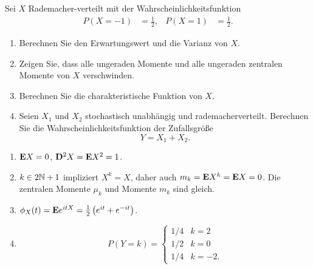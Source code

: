  Sei $X$ Rademacher-verteilt mit der
Wahrscheinlichkeitsfunktion
\begin{align*}
    P(X=-1) &= \frac{1}{2}, & P(X=1)& = \frac{1}{2}.
\end{align*}
\begin{enumerate}
    \item Berechnen Sie den Erwartungswert und die Varianz von $X$. 

    \item Zeigen Sie, dass alle ungeraden Momente und alle ungeraden zentralen
        Momente von $X$ verschwinden. 

    \item Berechnen Sie die charakteristische Funktion von $X$. 

    \item Seien $X_1$ und $X_2$ stochastisch unabhängig und rademacherverteilt.
        Berechnen Sie die Wahrscheinlichkeitsfunktion der Zufallsgröße
        \begin{equation*}
            Y = X_1 + X_2.
        \end{equation*}
\end{enumerate}

\solution
\begin{enumerate}
    \item $\mathbf E X= 0$, $\mathbf D^2 X = \mathbf E X^2 = 1$.
    \item $k\in 2\mathbb N+1$ impliziert $X^k= X$, daher auch $m_{k} = \mathbf E X^k = \mathbf E
        X=0$. Die zentralen Momente $\mu_k$ und Momente $m_{k}$ sind gleich. 
    \item $\phi_{X}(t) = \mathbf E e^{i t X} = \frac{1}{2} \left(  e^{it} + e^{-it} \right)$.
    \item \begin{equation*}
            P(Y=k) =
            \begin{cases}
                1/4 & k=2 \\
                1/2 & k=0 \\
                1/4 & k=-2.
            \end{cases}
        \end{equation*}
\end{enumerate}


